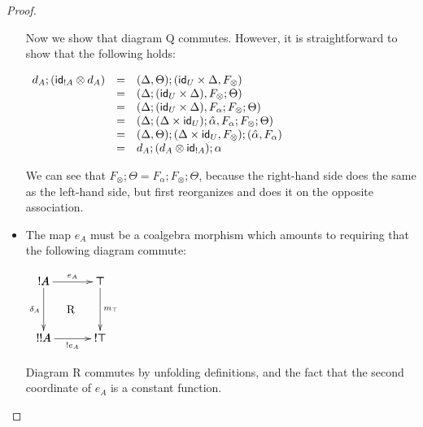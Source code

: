 \begin{proof}
\begin{report}
\begin{itemize}
    Now we show that diagram Q commutes. However, it is
    straightforward to show that the following holds:
    \begin{center}
      \begin{math}
        \begin{array}{lll}
          d_A;(\mathsf{id}_{!A} \otimes d_A)
          & = & (\Delta,\Theta);(\mathsf{id}_U \times \Delta,F_\otimes)\\
          & = & (\Delta;(\mathsf{id}_U \times \Delta),F_\otimes;\Theta)\\
          & = & (\Delta;(\mathsf{id}_U \times \Delta),F_\alpha;F_\otimes;\Theta)\\
          & = & (\Delta;(\Delta \times \mathsf{id}_U);\hat{\alpha},F_\alpha;F_\otimes;\Theta)\\
          & = & (\Delta,\Theta);(\Delta \times \mathsf{id}_U,F_\otimes);(\hat{\alpha},F_\alpha)\\
          & = & d_A;(d_A \otimes \mathsf{id}_{!A});\alpha\\
        \end{array}
      \end{math}
    \end{center}
    We can see that $F_\otimes;\Theta = F_\alpha;F_\otimes;\Theta$,
    because the right-hand side does the same as the left-hand side,
    but first reorganizes and does it on the opposite association.

  \item The map $e_A$ must be a coalgebra morphism which amounts to
    requiring that the following diagram commute:
    \begin{center}
      \begin{math}
        \bfig
        \square/->`->`->`->/[!A`\top`!!A`!\top;e_A`\delta_A`m_\top`!e_A]
        \place(240,250)[\text{R}]        
        \efig
      \end{math}
    \end{center}
    Diagram R commutes by unfolding definitions, and the fact that the
    second coordinate of $e_A$ is a constant function.


\end{itemize}
\end{report}
\end{proof}
